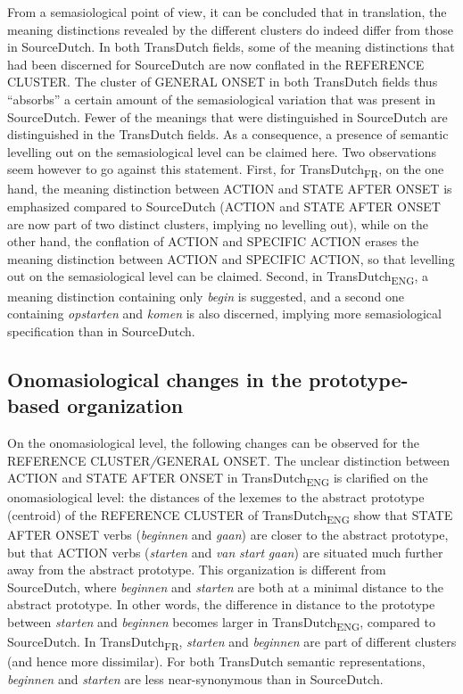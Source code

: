 From a semasiological point of view, it can be concluded that in translation, the meaning distinctions revealed by the different clusters do indeed differ from those in SourceDutch. In both TransDutch fields, some of the meaning distinctions that had been discerned for SourceDutch are now conflated in the REFERENCE CLUSTER. The cluster of GENERAL ONSET in both TransDutch fields thus ``absorbs'' a certain amount of the semasiological variation that was present in SourceDutch. Fewer of the meanings that were distinguished in SourceDutch are distinguished in the TransDutch fields. As a consequence, a presence of semantic levelling out on the semasiological level can be claimed here. Two observations seem however to go against this statement. First, for TransDutch\textsubscript{FR}, on the one hand, the meaning distinction between ACTION and STATE AFTER ONSET is emphasized compared to SourceDutch (ACTION and STATE AFTER ONSET are now part of two distinct clusters, implying no levelling out), while on the other hand, the conflation of ACTION and {SPECIFIC} ACTION erases the meaning distinction between ACTION and {SPECIFIC} ACTION, so that levelling out on the semasiological level can be claimed. Second, in TransDutch\textsubscript{ENG}, a meaning distinction containing only \textit{begin} is suggested, and a second one containing \textit{opstarten} and \textit{komen} is also discerned, implying more semasiological specification than in SourceDutch.

\subsection{Onomasiological changes in the prototype-based organization}
\label{sec:4.5.2}  
On the onomasiological level, the following changes can be observed for the REFERENCE CLUSTER\textit{/}GENERAL ONSET. The unclear distinction between ACTION and STATE AFTER ONSET in TransDutch\textsubscript{ENG} is clarified on the onomasiological level: the distances of the lexemes to the abstract prototype (centroid) of the REFERENCE CLUSTER of TransDutch\textsubscript{ENG} show that STATE AFTER ONSET verbs (\textit{beginnen} and \textit{gaan}) are closer to the abstract prototype, but that ACTION verbs (\textit{starten} and \textit{van} \textit{start} \textit{gaan}) are situated much further away from the abstract prototype. This organization is different from SourceDutch, where \textit{beginnen} and \textit{starten} are both at a minimal distance to the abstract prototype. In other words, the difference in distance to the prototype between \textit{starten} and \textit{beginnen} becomes larger in TransDutch\textsubscript{ENG}, compared to SourceDutch. In TransDutch\textsubscript{FR}, \textit{starten} and \textit{beginnen} are part of different clusters (and hence more dissimilar). For both TransDutch semantic representations, \textit{beginnen} and \textit{starten} are less near-synonymous than in SourceDutch.

